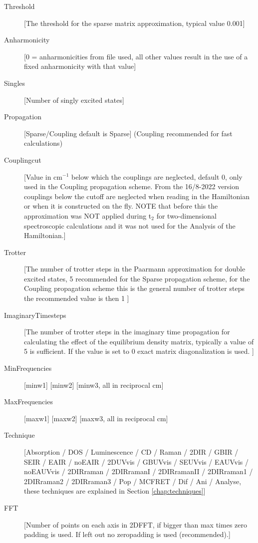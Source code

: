 \begin{description}
\item [Threshold][The threshold for the sparse matrix approximation, typical value 0.001]
\item [Anharmonicity] [0 = anharmonicities from file used, all other values result in the use of a fixed anharmonicity with that value]
\item [Singles] [Number of singly excited states]
\item [Propagation] [Sparse/Coupling default is Sparse] (Coupling recommended for fast calculations)
\item [Couplingcut] [Value in cm$^{-1}$ below which the couplings are neglected, default 0, only used in the Coupling propagation scheme. From the 16/8-2022 version couplings below the cutoff are neglected when reading in the Hamiltonian or when it is constructed on the fly. NOTE that before this the approximation was NOT applied during t$_2$ for two-dimensional spectroscopic calculations and it was not used for the Analysis of the Hamiltonian.]
\item [Trotter] [The number of trotter steps in the Paarmann approximation for double excited 
states, 5 recommended for the Sparse propagation scheme, for the Coupling propagation scheme this is the general number of trotter steps the recommended value is then 1 ]
\item [ImaginaryTimesteps] [The number of trotter steps in the imaginary time propagation for calculating the effect of the equilibrium density matrix, typically a value of 5 is sufficient. If the value is set to 0 exact matrix diagonalization is used. ]
\item [MinFrequencies] [minw1] [minw2] [minw3, all in reciprocal cm]
\item [MaxFrequencies] [maxw1] [maxw2] [maxw3, all in reciprocal cm]
\item [Technique] [Absorption / DOS / Luminescence / CD / Raman / 2DIR / GBIR / SEIR / EAIR / noEAIR / 2DUVvis / GBUVvis / SEUVvis / EAUVvis / noEAUVvis / 2DIRraman / 2DIRramanI / 2DIRramanII / 2DIRraman1 / 2DIRraman2 / 2DIRraman3 / Pop / MCFRET / Dif / Ani / Analyse, these techniques are explained in Section \ref{chap:techniques}]
\item [FFT] [Number of points on each axis in 2DFFT, if bigger than max times zero padding is used. If left out no zeropadding is used (recommended).]

\end{description}
